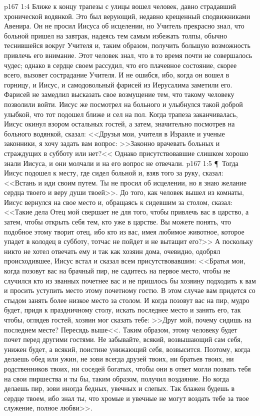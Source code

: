 \vs p167 1:4 Ближе к концу трапезы с улицы вошел человек, давно страдавший хронической водянкой. Это был верующий, недавно крещенный сподвижниками Авенира. Он не просил Иисуса об исцелении, но Учитель прекрасно знал, что больной пришел на завтрак, надеясь тем самым избежать толпы, обычно теснившейся вокруг Учителя и, таким образом, получить большую возможность привлечь его внимание. Этот человек знал, что в то время почти не совершалось чудес; однако в сердце своем рассудил, что его плачевное состояние, скорее всего, вызовет сострадание Учителя. И не ошибся, ибо, когда он вошел в горницу, и Иисус, и самодовольный фарисей из Иерусалима заметили его. Фарисей не замедлил высказать свое возмущение тем, что такому человеку позволили войти. Иисус же посмотрел на больного и улыбнулся такой доброй улыбкой, что тот подошел ближе и сел на пол. Когда трапеза заканчивалась, Иисус окинул взором остальных гостей, а затем, значительно посмотрев на больного водянкой, сказал: <<Друзья мои, учителя в Израиле и ученые законники, я хочу задать вам вопрос: >>Законно врачевать больных и страждущих в субботу или нет?<< Однако присутствовавшие слишком хорошо знали Иисуса, и они молчали и на его вопрос не отвечали.
\vs p167 1:5 \P\ Тогда Иисус подошел к месту, где сидел больной и, взяв того за руку, сказал: <<Встань и иди своим путем. Ты не просил об исцелении, но я знаю желание сердца твоего и веру души твоей>>. До того, как человек вышел из комнаты, Иисус вернулся на свое место и, обращаясь к сидевшим за столом, сказал: <<Такие дела Отец мой свершает не для того, чтобы привлечь вас в царство, а затем, чтобы открыть себя тем, кто уже в царстве. Вы можете понять, что подобное этому творит отец, ибо кто из вас, имея любимое животное, которое упадет в колодец в субботу, тотчас не пойдет и не вытащит его?>> А поскольку никто не хотел отвечать ему и так как хозяин дома, очевидно, одобрял происходившее, Иисус встал и сказал всем присутствовавшим: <<Братья мои, когда позовут вас на брачный пир, не садитесь на первое место, чтобы не случился кто из званных почетнее вас и не пришлось бы хозяину подходить к вам и просить уступить место этому почетному гостю. В этом случае вам придется со стыдом занять более низкое место за столом. И когда позовут вас на пир, мудро будет, придя к праздничному столу, искать последнее место и занять его, так чтобы, оглядев гостей, хозяин мог сказать тебе: >>Друг мой, почему сидишь на последнем месте? Пересядь выше<<. Таким образом, этому человеку будет почет перед другими гостями. Не забывайте, всякий, возвышающий сам себя, унижен будет, а всякий, поистине унижающий себя, возвысится. Поэтому, когда делаешь обед или ужин, не зови всегда друзей твоих, ни братьев твоих, ни родственников твоих, ни соседей богатых, чтобы они в ответ могли позвать тебя на свои пиршества и ты бы, таким образом, получил воздаяние. Но когда делаешь пир, зови иногда бедных, увечных и слепых. Так блажен будешь в сердце твоем, ибо знал ты, что хромые и увечные не могут воздать тебе за твое служение, полное любви>>.
